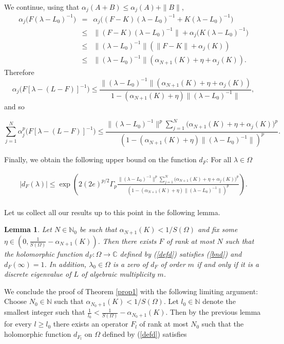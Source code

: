 \documentclass[12pt,a4paper]{article}
\newtheorem {lemma}[theorem]{Lemma}
\theoremstyle{definition}
\theoremstyle{remark}
\numberwithin{equation}{section}
\newcommand{\mn}{{\mathbb N}}
\begin{document}
We continue, using that $\alpha_j(A+B) \leq  \alpha_j(A) + \|B\|$,
\begin{eqnarray*} 
\alpha_j\Big(F(\lambda - L_0)^{-1}\Big)&=& \alpha_j\Big((F-K)(\lambda - L_0)^{-1}+ K(\lambda -L_0)^{-1}\Big)\\
 &\leq& \|(F-K)(\lambda - L_0)^{-1}\|+ \alpha_j\Big(K(\lambda -L_0)^{-1}\Big)\\
 &\leq&  \|(\lambda - L_0)^{-1}\| \left( \|F-K\| + \alpha_j(K) \right) \\
 &\leq&  \|(\lambda - L_0)^{-1}\| \left( \alpha_{N+1}(K)+\eta + \alpha_j(K) \right).
\end{eqnarray*}
Therefore
$$\alpha_j\Big(F[\lambda-(L-F)]^{-1}\Big)  \leq \frac{\|(\lambda - L_0)^{-1}\| \left( \alpha_{N+1}(K)+\eta + \alpha_j(K) \right)}{1-(\alpha_{N+1}(K)+\eta)\|(\lambda-L_0)^{-1}\|},$$
and so
\begin{small}
$$\sum_{j=1}^N\alpha_j^p\Big(F[\lambda-(L-F)]^{-1}\Big)  \leq \frac{\|(\lambda - L_0)^{-1}\|^p \sum_{j=1}^N\Big( \alpha_{N+1}(K)+\eta + \alpha_j(K) \Big)^p}{\left(1-(\alpha_{N+1}(K)+\eta)\|(\lambda-L_0)^{-1}\|\right)^p}.$$
\end{small}
Finally,
we obtain the following upper bound on the function $d_F$: For all $\lambda \in \Omega$ 
\begin{small}
\begin{eqnarray}\label{bnd}
|d_{F}(\lambda)| \leq \exp\left(2(2e)^{p/2} \Gamma_p \frac{\|(\lambda - L_0)^{-1}\|^p \sum_{j=1}^N\Big( \alpha_{N+1}(K)+\eta + \alpha_j(K) \Big)^p}{\left(1-(\alpha_{N+1}(K)+\eta)\|(\lambda-L_0)^{-1}\|\right)^p}\right).\nonumber\\
\end{eqnarray}
\end{small}
Let us collect all our results up to this point in the following lemma. 
\begin{lemma}\label{lemma1.1} 
Let $N\in\mathbb{N}_0$ be such that $\alpha_{N+1}(K)< 1 / S(\Omega)$ and fix some $ \eta \in (0,\frac{1}{S(\Omega)}-\alpha_{N+1}(K))$. Then there exists $F$ of rank at most $N$ such that the holomorphic function $d_{F}: \Omega\rightarrow \mathbb{C}$ defined by (\ref{defd}) satisfies (\ref{bnd}) and $d_{F}(\infty)=1$. In addition,  $\lambda_0 \in \Omega$ is a zero of $d_{F}$ of order $m$ if and only if it is a discrete eigenvalue of $L$ of algebraic multiplicity $m$.
\end{lemma} 
We conclude the proof of Theorem \ref{prop1} with the following limiting argument: Choose $N_0 \in \mn$ such that $\alpha_{N_0+1}(K)< 1 / S(\Omega)$. Let  $l_0\in\mathbb{N}$ denote the smallest integer such that $\frac{1}{l_0}<\frac{1}{S(\Omega)}-\alpha_{N_0+1}(K)$. Then by the previous lemma for every $l\geq l_0$ there exists an operator $F_l$ of rank at most $N_0$ such that the holomorphic function $d_{F_l}$ on $\Omega$ defined by (\ref{defd}) satisfies 
\end{document}
